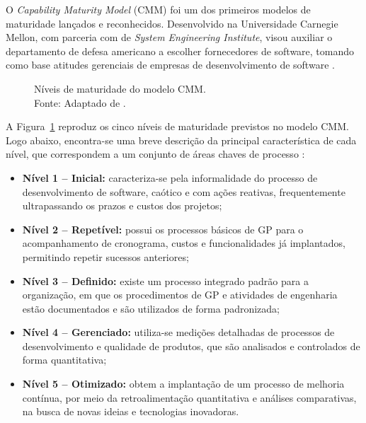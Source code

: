     O \textit{Capability Maturity Model} (CMM) foi um dos primeiros modelos de maturidade lançados e reconhecidos. Desenvolvido na Universidade Carnegie Mellon, com parceria com de \textit{System Engineering Institute}, visou auxiliar o departamento de defesa americano a escolher fornecedores de software, tomando como base atitudes gerenciais de empresas de desenvolvimento de software \cite{carvalho2011fundamentos}.

    \begin{figure}[!h]
      \centering
      \caption{Níveis de maturidade do modelo CMM.\\ Fonte: Adaptado de \cite{mezzena2007beneficios}.}
      \label{cmm}
    \end{figure}

    A Figura~\ref{cmm} reproduz os cinco níveis de maturidade previstos no modelo CMM. Logo abaixo, encontra-se uma breve descrição da principal característica de cada nível, que correspondem a um conjunto de áreas chaves de processo \cite{mezzena2007beneficios} :

    \begin{itemize}
      \item \textbf{Nível 1 – Inicial:} caracteriza-se pela informalidade do processo de desenvolvimento de software, caótico e com ações reativas, frequentemente ultrapassando os prazos e custos dos projetos;
      \item \textbf{Nível 2 – Repetível:} possui os processos básicos de GP para o acompanhamento de cronograma, custos e funcionalidades já implantados, permitindo repetir sucessos anteriores;
      \item \textbf{Nível 3 – Definido:} existe um processo integrado padrão para a organização, em que os procedimentos de GP e atividades de engenharia estão documentados e são utilizados de forma padronizada;
      \item \textbf{Nível 4 – Gerenciado:} utiliza-se medições detalhadas de processos de desenvolvimento e qualidade de produtos, que são analisados e controlados de forma quantitativa;
      \item \textbf{Nível 5 – Otimizado:} obtem a implantação de um processo de melhoria contínua, por meio da retroalimentação quantitativa e análises comparativas, na busca de novas ideias e tecnologias inovadoras.
    \end{itemize}

